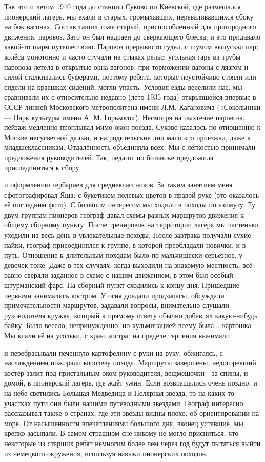 \label{17-1}
Так что и летом 1940 года до станции Суково по Киевской, где размещался пионерский лагерь, мы ехали в старых, громыхавших, переваливавшихся сбоку на бок вагонах. Состав тащил тоже старый, приспособленный для пригородного движения, паровоз. Зато он был надраен до сверкающего блеска, и это придавало какой-то шарм путешествию. Паровоз прерывисто гудел, с шумом выпускал пар; колёса монотонно и часто стучали на стыках рельс; угольная гарь из трубы паровоза летела в открытые окна вагонов; при торможении вагоны с лязгом и силой сталкивались буферами, поэтому ребята, которые неустойчиво стояли или сидели на краешках сидений, могли упасть. Условия езды веселили нас, мы сравнивали их с относительно недавно (лето 1935 года) открывшейся впервые в СССР линией Московского метрополитена имени Л.М. Кагановича («Сокольники — Парк культуры имени А. М. Горького»). Несмотря на пыхтение паровоза, пейзаж медленно проплывал мимо окон поезда. Суково казалось по отношению к Москве несусветной далью, и на родительские дни мало кто приезжал, даже к младшеклассникам. Отдалённость объединяла всех. Мы с лёгкостью принимали предложения руководителей. Так, педагог по ботанике предложила присоединиться к сбору

\label{18-1}
и оформлению гербариев для среднеклассников. За таким занятием меня сфотографировал Яша: с букетиком полевых цветов в правой руке (это оказалось её последним фото). С большим интересом мы ходили в походы по азимуту. Ту двум группам пионеров географ давал схемы разных маршрутов движения к общему сборному пункту. После тренировок на территории лагеря мы частенько уходили на весь день в увлекательные походы. После завтрака получали сухие пайки, географ присоединялся к группе, в которой преобладали новички, и в путь. Отношение к длительным походам было по-мальчишески серьёзное, у девочек тоже. Даже в тех случаях, когда выходили на знакомую местность, всё равно сверяли заданное в схеме с нашим движением, в этом был особый штурманский фарс. На сборный пункт сходились к концу дня. Пришедшие первыми занимались костром. У огня доедали продзапасы, обсуждали примечательности маршрутов, задавали вопросы, внимательно слушали руководителя кружка, который к прямому ответу обычно добавлял какую-нибудь байку. Было весело, непринужденно, но кульминацией всему была... картошка. Мы клали её на угольки, с краю костра: на пределе терпения вынимали

\label{19-1}
и перебрасывали печенную картофелину с руки на руку, обжигаясь, с наслаждением пожирали королеву похода. Маршруты завершены, недогоревший костёр залит под пристальным оком руководителя, вещмешочки - за спины, и домой, в пионерский лагерь, где ждёт ужин. Если возвращались очень поздно, и на небе светились Большая Медведица и Полярная звезда, то на каких-то участках пути они были нашими путеводными звёздами. Географ интересно рассказывал также о странах, где эти звёзды видны плохо, об ориентировании на море. От насыщенности впечатлениями большого дня, вконец уставшие, мы крепко засыпали. В самом страшном сне никому не могло присниться, что некоторые из старших ребят немногим более чем через год будут пытаться выйти из немецкого окружения, используя навыки пионерских походов.

